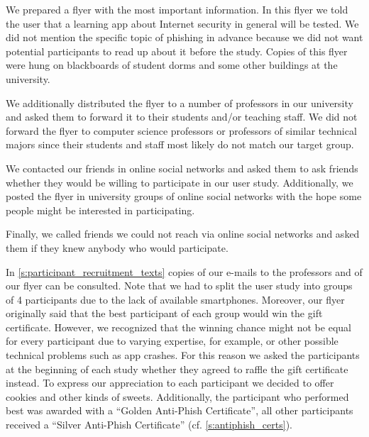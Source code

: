 \begin{description}[leftmargin=0cm]
\item[Flyer:]  We prepared a flyer with the most important information. 
In this flyer we told the user that a learning app about Internet security in general will be tested. 
We did not mention the specific topic of phishing in advance because we did not want potential participants to read up about it before the study.
Copies of this flyer were hung on blackboards of student dorms and some other buildings at the university.
\item[E-Mail to Professors:] We additionally distributed the flyer to a number of professors in our university and asked them to forward it to their students and/or teaching staff.
We did not forward the flyer to computer science professors or professors of similar technical majors since their students and staff most likely do not match our target group.
\item[Online Social Networks:] We contacted our friends in online social networks and asked them to ask friends whether they would be willing to participate in our user study.
Additionally, we posted the flyer in university groups of online social networks with the hope some people might be interested in participating.
\item[Further Networks:] Finally, we called friends we could not reach via online social networks and asked them if they knew anybody who would participate.
\end{description}
In \autoref{s:participant_recruitment_texts} copies of our e-mails to the professors and of our flyer can be consulted.
Note that we had to split the user study into groups of 4 participants due to the lack of available smartphones.
Moreover, our flyer originally said that the best participant of each group would win the gift certificate.
However, we recognized that the winning chance might not be equal for every participant due to varying expertise, for example, or other possible technical problems such as app crashes.
For this reason we asked the participants at the beginning of each study whether they agreed to raffle the gift certificate instead.
To express our appreciation to each participant we decided to offer cookies and other kinds of sweets.
Additionally, the participant who performed best was awarded with a ``Golden Anti-Phish Certificate'', all other participants received a ``Silver Anti-Phish Certificate'' (cf. \autoref{s:antiphish_certs}).

